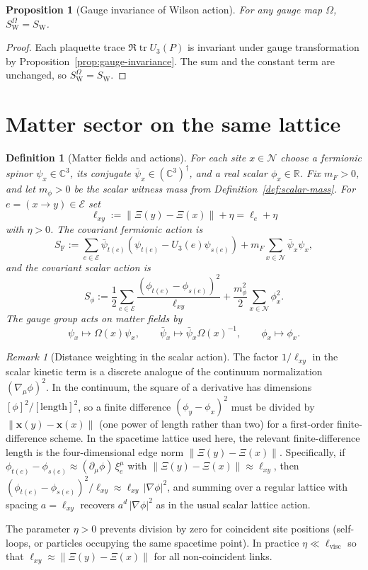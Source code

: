 \documentclass[11pt]{article}
\newtheorem{definition}[theorem]{Definition}
\newtheorem{proposition}[theorem]{Proposition}
\theoremstyle{remark}
\newtheorem{remark}[theorem]{Remark}
\newcommand{\R}{\mathbb R}
\newcommand{\C}{\mathbb C}
\newcommand{\mcN}{\mathcal N}
\newcommand{\mcE}{\mathcal E}
\newcommand{\tr}{\operatorname{tr}}
\begin{document}
\begin{proposition}[Gauge invariance of Wilson action]
\label{prop:wilson-gauge}
For any gauge map $\Omega$, $S_{\mathrm W}^\Omega=S_{\mathrm W}$.
\end{proposition}
\begin{proof}
Each plaquette trace $\Re\tr U_3(P)$ is invariant under gauge transformation by
Proposition~\ref{prop:gauge-invariance}.
The sum and the constant term are unchanged, so $S_{\mathrm W}^\Omega=S_{\mathrm W}$.
\end{proof}

\section{Matter sector on the same lattice}
\label{sec:matter}

\begin{definition}[Matter fields and actions]
\label{def:matter}
For each site $x\in\mcN$ choose a fermionic spinor $\psi_x\in\C^3$,
its conjugate $\bar\psi_x\in(\C^3)^\dagger$, and a real scalar $\phi_x\in\R$.
Fix $m_F>0$, and let $m_\phi>0$ be the scalar witness mass from
Definition~\ref{def:scalar-mass}.
For $e=(x\to y)\in\mcE$ set
\[
\ell_{xy}:=\|\Xi(y)-\Xi(x)\|+\eta=\ell_e+\eta
\]
with $\eta>0$.
The covariant fermionic action is
\[
S_{\mathrm F}:=\sum_{e\in\mcE}\bar\psi_{t(e)}\left(\psi_{t(e)}-U_3(e)\psi_{s(e)}\right)
+m_F\sum_{x\in\mcN}\bar\psi_x\psi_x,
\]
and the covariant scalar action is
\[
S_\phi:=\frac12\sum_{e\in\mcE}\frac{(\phi_{t(e)}-\phi_{s(e)})^2}{\ell_{xy}}
+\frac{m_\phi^2}{2}\sum_{x\in\mcN}\phi_x^2.
\]
The gauge group acts on matter fields by
\[
\psi_x\mapsto\Omega(x)\psi_x,\qquad
\bar\psi_x\mapsto\bar\psi_x\Omega(x)^{-1},\qquad
\phi_x\mapsto\phi_x.
\]
\end{definition}

\begin{remark}[Distance weighting in the scalar action]
\label{rem:distance-weight}
The factor $1/\ell_{xy}$ in the scalar kinetic term is a discrete analogue of
the continuum normalization $(\nabla_\mu\phi)^2$.
In the continuum, the square of a derivative has dimensions $[\phi]^2/[\text{length}]^2$,
so a finite difference $(\phi_y-\phi_x)^2$ must be divided by $\|\mathbf x(y)-\mathbf x(x)\|$
(one power of length rather than two) for a first-order finite-difference scheme.
In the spacetime lattice used here, the relevant finite-difference length is the
four-dimensional edge norm $\|\Xi(y)-\Xi(x)\|$.
Specifically, if $\phi_{t(e)}-\phi_{s(e)}\approx (\partial_\mu\phi)\,\xi_e^\mu$
with $\|\Xi(y)-\Xi(x)\|\approx\ell_{xy}$, then
$(\phi_{t(e)}-\phi_{s(e)})^2/\ell_{xy}\approx \ell_{xy}\,|\nabla\phi|^2$,
and summing over a regular lattice with spacing $a=\ell_{xy}$ recovers
$a^d\,|\nabla\phi|^2$ as in the usual scalar lattice action.

The parameter $\eta>0$ prevents division by zero for coincident site positions
(self-loops, or particles occupying the same spacetime point).
In practice $\eta\ll\ell_{\mathrm{visc}}$ so that $\ell_{xy}\approx\|\Xi(y)-\Xi(x)\|$
for all non-coincident links.
\end{remark}
\end{document}
